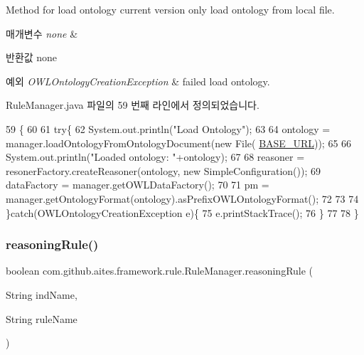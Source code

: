 Method for load ontology current version only load ontology from local file. 


\begin{DoxyParams}{매개변수}
{\em none} & \\
\hline
\end{DoxyParams}
\begin{DoxyReturn}{반환값}
none 
\end{DoxyReturn}

\begin{DoxyExceptions}{예외}
{\em O\+W\+L\+Ontology\+Creation\+Exception} & failed load ontology. \\
\hline
\end{DoxyExceptions}


Rule\+Manager.\+java 파일의 59 번째 라인에서 정의되었습니다.


\begin{DoxyCode}
59                                \{
60         
61         \textcolor{keywordflow}{try}\{
62             System.out.println(\textcolor{stringliteral}{"Load Ontology"});
63     
64             ontology = manager.loadOntologyFromOntologyDocument(\textcolor{keyword}{new} File(
      \mbox{\hyperlink{classcom_1_1github_1_1aites_1_1framework_1_1rule_1_1_rule_manager_ac1b9ec84300caaf946326a6c6aa479de}{BASE\_URL}}));
65             
66             System.out.println(\textcolor{stringliteral}{"Loaded ontology: "}+ontology);
67         
68             reasoner = resonerFactory.createReasoner(ontology, \textcolor{keyword}{new} SimpleConfiguration());
69             dataFactory = manager.getOWLDataFactory();
70         
71             pm = manager.getOntologyFormat(ontology).asPrefixOWLOntologyFormat();
72         
73             
74         \}\textcolor{keywordflow}{catch}(OWLOntologyCreationException e)\{
75             e.printStackTrace();
76         \}
77         
78     \}
\end{DoxyCode}
\mbox{\label{classcom_1_1github_1_1aites_1_1framework_1_1rule_1_1_rule_manager_a61cbbdc8264de5d080789cc387be669c}} 
\subsubsection{\texorpdfstring{reasoning\+Rule()}{reasoningRule()}}
{\footnotesize\ttfamily boolean com.\+github.\+aites.\+framework.\+rule.\+Rule\+Manager.\+reasoning\+Rule (\begin{DoxyParamCaption}\item[{String}]{ind\+Name,  }\item[{String}]{rule\+Name }\end{DoxyParamCaption})}



